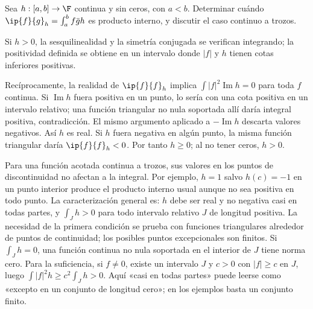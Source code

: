 \begin{ejercicio}\label{ej:lectura-29-6}
Sea $h:[a,b]\to\F$ continua y sin ceros, con $a<b$. Determinar cuándo $\ip{f}{g}_h=\int_a^b f\bar g h$ es producto interno, y discutir el caso continuo a trozos.
\end{ejercicio}
\begin{solucion}
Si $h>0$, la sesquilinealidad y la simetría conjugada se verifican integrando; la positividad definida se obtiene en un intervalo donde $|f|$ y $h$ tienen cotas inferiores positivas.

Recíprocamente, la realidad de $\ip{f}{f}_h$ implica $\int|f|^{2}\operatorname{Im}h=0$ para toda $f$ continua. Si $\operatorname{Im}h$ fuera positiva en un punto, lo sería con una cota positiva en un intervalo relativo; una función triangular no nula soportada allí daría integral positiva, contradicción. El mismo argumento aplicado a $-\operatorname{Im}h$ descarta valores negativos. Así $h$ es real. Si $h$ fuera negativa en algún punto, la misma función triangular daría $\ip{f}{f}_h<0$. Por tanto $h\geq0$; al no tener ceros, $h>0$.

Para una función acotada continua a trozos, sus valores en los puntos de discontinuidad no afectan a la integral. Por ejemplo, $h=1$ salvo $h(c)=-1$ en un punto interior produce el producto interno usual aunque no sea positiva en todo punto. La caracterización general es: $h$ debe ser real y no negativa casi en todas partes, y $\int_J h>0$ para todo intervalo relativo $J$ de longitud positiva. La necesidad de la primera condición se prueba con funciones triangulares alrededor de puntos de continuidad; los posibles puntos excepcionales son finitos. Si $\int_Jh=0$, una función continua no nula soportada en el interior de $J$ tiene norma cero. Para la suficiencia, si $f\ne0$, existe un intervalo $J$ y $c>0$ con $|f|\geq c$ en $J$, luego $\int|f|^{2}h\geq c^{2}\int_Jh>0$. Aquí «casi en todas partes» puede leerse como «excepto en un conjunto de longitud cero»; en los ejemplos basta un conjunto finito.
\end{solucion}

